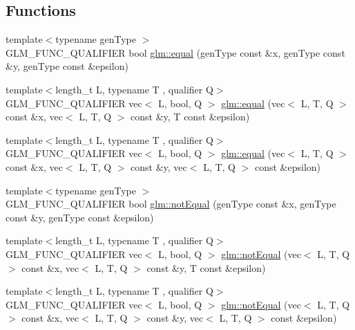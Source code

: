 \subsection*{Functions}
\begin{DoxyCompactItemize}
\item 
{\footnotesize template$<$typename gen\+Type $>$ }\\G\+L\+M\+\_\+\+F\+U\+N\+C\+\_\+\+Q\+U\+A\+L\+I\+F\+I\+ER bool \hyperlink{group__ext__vector__relational_gac4ae021e79693174e4de6560d159b33a}{glm\+::equal} (gen\+Type const \&x, gen\+Type const \&y, gen\+Type const \&epsilon)
\item 
{\footnotesize template$<$length\+\_\+t L, typename T , qualifier Q$>$ }\\G\+L\+M\+\_\+\+F\+U\+N\+C\+\_\+\+Q\+U\+A\+L\+I\+F\+I\+ER vec$<$ L, bool, Q $>$ \hyperlink{group__ext__vector__relational_gae630b1f87fbd3b762ca46b0b8b32b02e}{glm\+::equal} (vec$<$ L, T, Q $>$ const \&x, vec$<$ L, T, Q $>$ const \&y, T const \&epsilon)
\item 
{\footnotesize template$<$length\+\_\+t L, typename T , qualifier Q$>$ }\\G\+L\+M\+\_\+\+F\+U\+N\+C\+\_\+\+Q\+U\+A\+L\+I\+F\+I\+ER vec$<$ L, bool, Q $>$ \hyperlink{group__ext__vector__relational_ga6fb2432528edd028e3c2cf5b78d99797}{glm\+::equal} (vec$<$ L, T, Q $>$ const \&x, vec$<$ L, T, Q $>$ const \&y, vec$<$ L, T, Q $>$ const \&epsilon)
\item 
{\footnotesize template$<$typename gen\+Type $>$ }\\G\+L\+M\+\_\+\+F\+U\+N\+C\+\_\+\+Q\+U\+A\+L\+I\+F\+I\+ER bool \hyperlink{group__ext__vector__relational_ga27c5118811bcfed5504e50f22693373e}{glm\+::not\+Equal} (gen\+Type const \&x, gen\+Type const \&y, gen\+Type const \&epsilon)
\item 
{\footnotesize template$<$length\+\_\+t L, typename T , qualifier Q$>$ }\\G\+L\+M\+\_\+\+F\+U\+N\+C\+\_\+\+Q\+U\+A\+L\+I\+F\+I\+ER vec$<$ L, bool, Q $>$ \hyperlink{group__ext__vector__relational_ga59a03a51402b6e1ce80f9a3b436f17bd}{glm\+::not\+Equal} (vec$<$ L, T, Q $>$ const \&x, vec$<$ L, T, Q $>$ const \&y, T const \&epsilon)
\item 
{\footnotesize template$<$length\+\_\+t L, typename T , qualifier Q$>$ }\\G\+L\+M\+\_\+\+F\+U\+N\+C\+\_\+\+Q\+U\+A\+L\+I\+F\+I\+ER vec$<$ L, bool, Q $>$ \hyperlink{group__ext__vector__relational_ga0497a636e5e8140bb7ebc021baf86637}{glm\+::not\+Equal} (vec$<$ L, T, Q $>$ const \&x, vec$<$ L, T, Q $>$ const \&y, vec$<$ L, T, Q $>$ const \&epsilon)

\end{DoxyCompactItemize}
